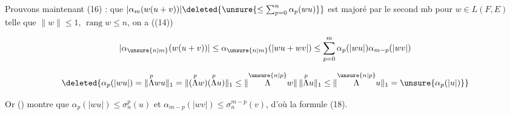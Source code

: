 Prouvons maintenant (16) :   que $|\alpha_m(w(u+v))|\deleted{\unsure{\leq\sum_{p=0}^{n}\alpha_p(wu)}}$ est majoré par le second mb pour  $w\in L(F,E)$ telle que $\lVert w\rVert\leq1$, $\operatorname{rang}w\leq n$,   on a ((14))

\[
|\alpha_{\unsure{n|m}}(w(u+v))|\leq\alpha_{\unsure{n|m}}(|wu+wv|)\leq\sum_{p=0}^{m}\alpha_p(|wu|)\alpha_{m-p}(|wv|)
\]


\[
\deleted{\alpha_p(|wu|)=\lVert\overset{p}{\Lambda}wu\rVert_1=\lVert(\overset{p}{\Lambda}w)(\overset{p}{\Lambda}u)\rVert_1\leq\lVert\overset{\unsure{n|p}}{\Lambda}w\rVert\,\lVert\overset{p}{\Lambda}u\rVert_1\leq\lVert\overset{\unsure{n|p}}{\Lambda}u\rVert_1=\unsure{\alpha_p(|u|)}}
\]

 Or () montre que $\alpha_p(|wu|)\leq\sigma_n^p(u)$ et $\alpha_{m-p}(|wv|)\leq\sigma_n^{m-p}(v)$, d'où la formule (18).
